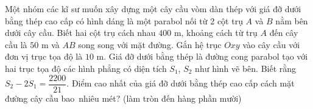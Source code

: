 \begin{bt}%
	Một nhóm các kĩ sư muốn xây dựng một cây cầu vòm dàn thép với giá đỡ dưới bằng thép cao cấp có hình dáng là một parabol nối từ 2 cột trụ $A$ và $B$ nằm bên dưới cây cầu. Biết hai cột trụ cách nhau $400$ m, khoảng cách từ trụ $A$ đến cây cầu là $50$  m và $AB$ song song với mặt đường.
	Gắn hệ trục $Oxy$ vào cây cầu với đơn vị trục tọa  độ là $10$ m. Giá đỡ dưới bằng thép là đường cong parabol tạo với hai trục tọa độ các hình phẳng có diện tích $S_1$, $S_2$ như hình vẽ bên. Biết rằng $S_2-2S_1=\dfrac{2200}{21}$. Điểm cao nhất của giá đỡ dưới bằng thép cao cấp cách mặt đường cây cầu bao~nhiêu mét? (làm tròn đến hàng phần mười)
\end{bt}

